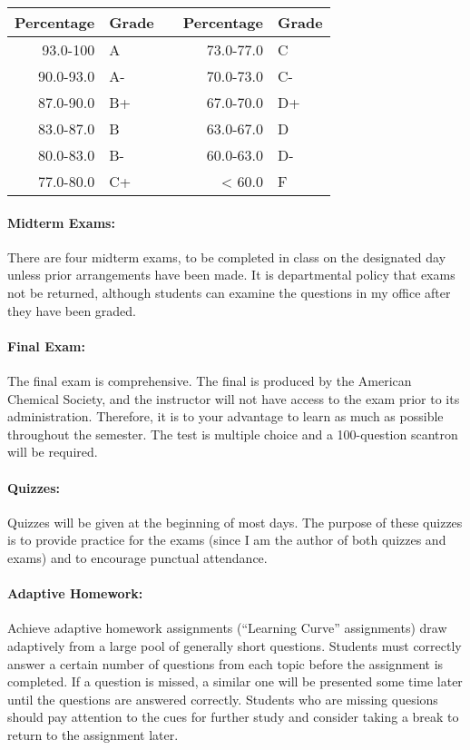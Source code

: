\documentclass[12pt, letterpaper]{article}
\begin{document}
\begin{tabular}{rl|c|rl}
	Percentage & Grade &  & Percentage & Grade \\ \midrule
	  93.0-100 & A     &  &  73.0-77.0 & C     \\
	 90.0-93.0 & A-    &  &  70.0-73.0 & C-    \\
	 87.0-90.0 & B+    &  &  67.0-70.0 & D+    \\
	 83.0-87.0 & B     &  &  63.0-67.0 & D     \\
	 80.0-83.0 & B-    &  &  60.0-63.0 & D-    \\
	 77.0-80.0 & C+    &  &     < 60.0 & F
\end{tabular}
\paragraph{Midterm Exams:}
There are four midterm exams, to be completed in class on the designated day unless prior arrangements have been made. It is departmental policy that exams not be returned, although students can examine the questions in my office after they have been graded.

\paragraph{Final Exam:}
The final exam is comprehensive. The final is produced by the American Chemical Society, and the instructor will not have access to the exam prior to its administration. Therefore, it is to your advantage to learn as much as possible throughout the semester. The test is multiple choice and a 100-question scantron will be required.

\paragraph{Quizzes:}
Quizzes will be given at the beginning of most days. The purpose of these quizzes is to provide practice for the exams (since I am the author of both quizzes and exams) and to encourage punctual attendance.

\paragraph{Adaptive Homework:}
Achieve adaptive homework assignments (``Learning Curve'' assignments) draw adaptively from a large pool of generally short questions. Students must correctly answer a certain number of questions from each topic before the assignment is completed. If a question is missed, a similar one will be presented some time later until the questions are answered correctly. Students who are missing quesions should pay attention to the cues for further study and consider taking a break to return to the assignment later.
\end{document}
